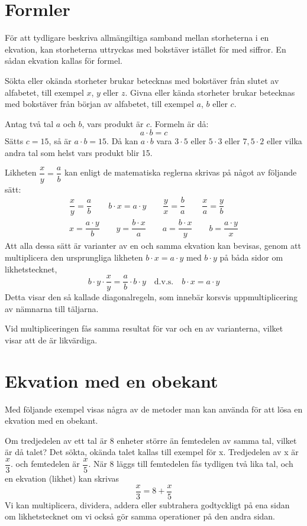 \section{Formler}

För att tydligare beskriva allmängiltiga samband mellan storheterna i en
ekvation, kan storheterna uttryckas med bokstäver istället för med siffror.
En sådan ekvation kallas för formel.

Sökta eller okända storheter brukar betecknas med bokstäver från slutet av
alfabetet, till exempel $x$, $y$ eller $z$.
Givna eller kända storheter brukar betecknas med bokstäver från början av
alfabetet, till exempel $a$, $b$ eller $c$.

Antag två tal $a$ och $b$, vars produkt är $c$.
Formeln är då:
\[a \cdot b = c\]
Sätts \(c = 15\), så är \(a \cdot b = 15\). Då kan \(a \cdot b\) vara \(3 \cdot
5\) eller \(5 \cdot 3\) eller \(7,5 \cdot 2\) eller vilka andra tal som helst
vars produkt blir 15.

Likheten \(\dfrac{x}{y} = \dfrac{a}{b}\) kan enligt de matematiska reglerna
skrivas på något av följande sätt:
\begin{gather*}
  \dfrac{x}{y} = \dfrac{a}{b} \qquad
b \cdot x = a \cdot y \qquad
\dfrac{y}{x} = \dfrac{b}{a} \qquad
\dfrac{x}{a} = \dfrac{y}{b} \\
x = \dfrac{a \cdot y}{b} \qquad
y = \dfrac{b \cdot x}{a} \qquad
a = \dfrac{b \cdot x}{y} \qquad
b = \dfrac{a \cdot y}{x}
\end{gather*}
Att alla dessa sätt är varianter av en och samma ekvation kan bevisas, genom att
multiplicera den ursprungliga likheten \(b \cdot x = a \cdot y\) med \(b \cdot
y\) på båda sidor om likhetstecknet,
\[
b \cdot y \cdot \frac{x}{y} = \frac{a}{b} \cdot b \cdot y \quad \text{d.v.s.}
\quad b \cdot x = a \cdot y
\]
Detta visar den så kallade diagonalregeln, som innebär korsvis uppmultiplicering av
nämnarna till täljarna.

Vid multipliceringen fås samma resultat för var och en av varianterna, vilket
visar att de är likvärdiga.

\section{Ekvation med en obekant}

Med följande exempel visas några av de metoder man kan använda för att lösa en
ekvation med en obekant.

Om tredjedelen av ett tal är 8 enheter större än femtedelen av samma tal, vilket
är då talet?
Det sökta, okända talet kallas till exempel för x.
Tredjedelen av x är \(\dfrac{x}{3}\). och femtedelen är \(\dfrac{x}{5}\).
När 8 läggs till femtedelen fås tydligen två lika tal, och en ekvation (likhet)
kan skrivas
\[\dfrac{x}{3}=8 + \dfrac{x}{5}\]
Vi kan multiplicera, dividera, addera eller subtrahera godtyckligt på ena sidan
om likhetstecknet om vi också gör samma operationer på den andra sidan.

